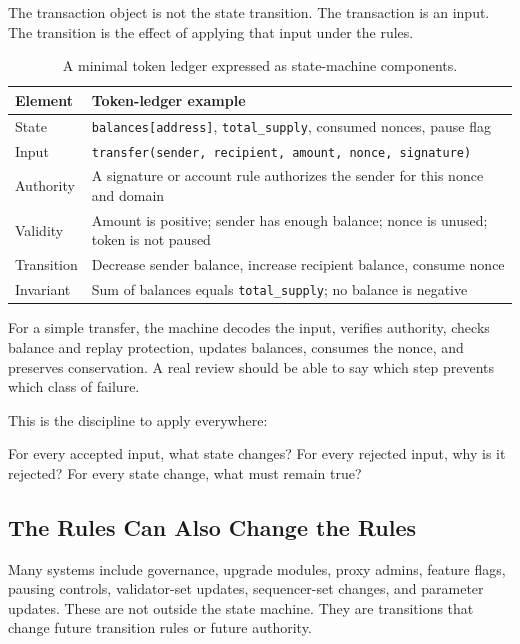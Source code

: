 The transaction object is not the state transition. The transaction is an input. The transition is the effect of applying that input under the rules.

\begin{table}[htbp]
\centering
\small
\renewcommand{\arraystretch}{1.18}
\begin{tabularx}{\textwidth}{@{}>{\RaggedRight\arraybackslash}p{}X@{}}
\toprule
Element & Token-ledger example \\
\midrule
State & \texttt{balances[address]}, \texttt{total\_supply}, consumed nonces, pause flag \\
Input & \texttt{transfer(sender, recipient, amount, nonce, signature)} \\
Authority & A signature or account rule authorizes the sender for this nonce and domain \\
Validity & Amount is positive; sender has enough balance; nonce is unused; token is not paused \\
Transition & Decrease sender balance, increase recipient balance, consume nonce \\
Invariant & Sum of balances equals \texttt{total\_supply}; no balance is negative \\
\bottomrule
\end{tabularx}
\caption{A minimal token ledger expressed as state-machine components.}
\end{table}

For a simple transfer, the machine decodes the input, verifies authority, checks balance and replay protection, updates balances, consumes the nonce, and preserves conservation. A real review should be able to say which step prevents which class of failure.

This is the discipline to apply everywhere:

\begin{codeblock}
For every accepted input, what state changes?
For every rejected input, why is it rejected?
For every state change, what must remain true?
\end{codeblock}

\subsection{The Rules Can Also Change the Rules}

Many systems include governance, upgrade modules, proxy admins, feature flags, pausing controls, validator-set updates, sequencer-set changes, and parameter updates. These are not outside the state machine. They are transitions that change future transition rules or future authority.

